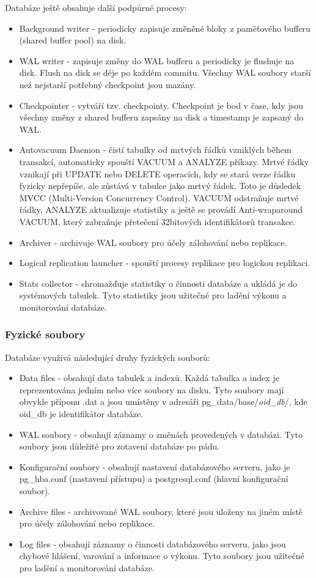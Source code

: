 Databáze ještě obsahuje další podpůrné procesy:
\begin{itemize}
  \item Background writer - periodicky zapisuje změněné bloky z paměťového bufferu (shared buffer pool) na disk.
  \item WAL writer - zapisuje změny do WAL bufferu a periodicky je flushuje na disk. Flush na disk se děje po každém commitu. Všechny WAL soubory starší než nejstarší potřebný checkpoint jsou mazány.
  \item Checkpointer - vytváří tzv. checkpointy. Checkpoint je bod v čase, kdy jsou všechny změny z shared bufferu zapsány na disk a timestamp je zapsaný do WAL.   
  \item Autovacuum Daemon - čistí tabulky od mrtvých řádků vzniklých během transakcí, automaticky spouští VACUUM a ANALYZE příkazy. Mrtvé řádky vznikají při UPDATE nebo DELETE operacích, kdy se stará verze řádku fyzicky nepřepíše, ale zůstává v tabulce jako mrtvý řádek. Toto je důsledek MVCC (Multi-Version Concurrency Control). VACUUM odstraňuje mrtvé řádky, ANALYZE aktualizuje statistiky a ještě se provádí Anti-wraparound VACUUM, který zabraňuje přetečení 32bitových identifikátorů transakce.
  \item Archiver - archivuje WAL soubory pro účely zálohování nebo replikace. 
  \item Logical replication launcher - spouští procesy replikace pro logickou replikaci.
    \item Stats collector - shromažďuje statistiky o činnosti databáze a ukládá je do systémových tabulek. Tyto statistiky jsou užitečné pro ladění výkonu a monitorování databáze.
\end{itemize}

\subsubsection*{Fyzické soubory}
Databáze využívá následující druhy fyzických souborů:
\begin{itemize}
    \item Data files - obsahují data tabulek a indexů. Každá tabulka a index je reprezentována jedním nebo více soubory na disku. Tyto soubory mají obvykle příponu .dat a jsou umístěny v adresáři pg\_data/base/\textit{oid\_db}/, kde oid\_db je identifikátor databáze.
  \item WAL soubory - obsahují záznamy o změnách provedených v databázi. Tyto soubory jsou důležité pro zotavení databáze po pádu.
  \item Konfigurační soubory - obsahují nastavení databázového serveru, jako je pg\_hba.conf (nastavení přístupu) a postgresql.conf (hlavní konfigurační soubor).
  \item Archive files - archivované WAL soubory, které jsou uloženy na jiném místě pro účely zálohování nebo replikace.
    \item Log files - obsahují záznamy o činnosti databázového serveru, jako jsou chybové hlášení, varování a informace o výkonu. Tyto soubory jsou užitečné pro ladění a monitorování databáze.
\end{itemize}

